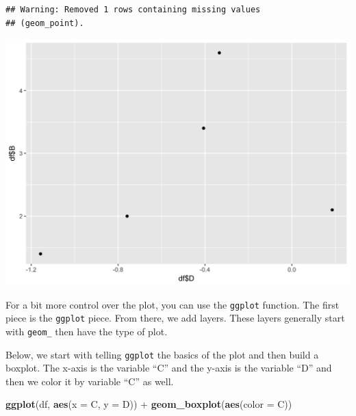 \documentclass[]{tufte-book}
\newenvironment{Shaded}{}{}
\newcommand{\KeywordTok}[1]{\textcolor[rgb]{0.00,0.44,0.13}{\textbf{#1}}}
\newcommand{\DataTypeTok}[1]{\textcolor[rgb]{0.56,0.13,0.00}{#1}}
\newcommand{\StringTok}[1]{\textcolor[rgb]{0.25,0.44,0.63}{#1}}
\newcommand{\OperatorTok}[1]{\textcolor[rgb]{0.40,0.40,0.40}{#1}}
\newcommand{\NormalTok}[1]{#1}
\theoremstyle{definition}
\theoremstyle{definition}
\theoremstyle{remark}
\begin{document}
\begin{Shaded}
\end{Shaded}

\begin{verbatim}
## Warning: Removed 1 rows containing missing values
## (geom_point).
\end{verbatim}

\includegraphics{_main_files/figure-latex/unnamed-chunk-57-2}

For a bit more control over the plot, you can use the \texttt{ggplot}
function. The first piece is the \texttt{ggplot} piece. From there, we
add layers. These layers generally start with \texttt{geom\_} then have
the type of plot.

Below, we start with telling \texttt{ggplot} the basics of the plot and
then build a boxplot. The x-axis is the variable ``C'' and the y-axis is
the variable ``D'' and then we color it by variable ``C'' as well.

\begin{Shaded}
\begin{Highlighting}[]
\KeywordTok{ggplot}\NormalTok{(df, }\KeywordTok{aes}\NormalTok{(}\DataTypeTok{x =}\NormalTok{ C, }\DataTypeTok{y =}\NormalTok{ D)) }\OperatorTok{+}\StringTok{ }\KeywordTok{geom_boxplot}\NormalTok{(}\KeywordTok{aes}\NormalTok{(}\DataTypeTok{color =}\NormalTok{ C))}
\end{Highlighting}
\end{Shaded}
\end{document}
